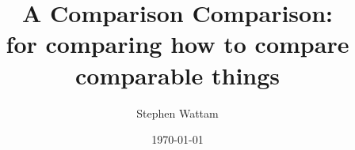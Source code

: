 \documentclass[11pt]{article}
\begin{document}
\title{A Comparison Comparison:\\
\small{for comparing how to compare comparable things}}
\author{Stephen Wattam}
\date{\today}
\maketitle

\tableofcontents{}
\pagebreak




% 
% 
% 
% 
% 
%     
% 
\end{document}
